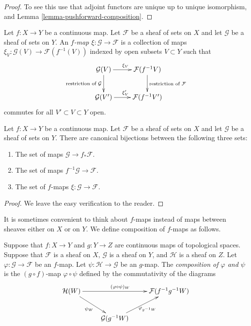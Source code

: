 \begin{proof}
To see this
use that adjoint functors are unique up to unique isomorphism,
and Lemma \ref{lemma-pushforward-composition}.
\end{proof}


\begin{definition}
\label{definition-f-map}
Let $f : X \to Y$ be a continuous map.
Let $\mathcal{F}$ be a sheaf of sets on $X$ and
let $\mathcal{G}$ be a sheaf of sets on $Y$.
An {\it $f$-map $\xi : \mathcal{G} \to \mathcal{F}$}
is a collection of maps
$\xi_V : \mathcal{G}(V) \to \mathcal{F}(f^{-1}(V))$
indexed by open subsets $V \subset Y$ such that
$$
\xymatrix{
\mathcal{G}(V) \ar[r]^{\xi_V} \ar[d]_{\text{restriction of }\mathcal{G}} &
\mathcal{F}(f^{-1}V) \ar[d]^{\text{restriction of }\mathcal{F}} \\
\mathcal{G}(V') \ar[r]^{\xi_V'} &
\mathcal{F}(f^{-1}V')
}
$$
commutes for all $V' \subset V \subset Y$ open.
\end{definition}

\begin{lemma}
\label{lemma-f-map}
Let $f : X \to Y$ be a continuous map.
Let $\mathcal{F}$ be a sheaf of sets on $X$ and
let $\mathcal{G}$ be a sheaf of sets on $Y$.
There are canonical bijections between the following three sets:
\begin{enumerate}
\item The set of maps $\mathcal{G} \to f_*\mathcal{F}$.
\item The set of maps $f^{-1}\mathcal{G} \to \mathcal{F}$.
\item The set of $f$-maps $\xi : \mathcal{G} \to \mathcal{F}$.
\end{enumerate}
\end{lemma}

\begin{proof}
We leave the easy verification to the reader.
\end{proof}

\noindent
It is sometimes convenient to think about $f$-maps
instead of maps between sheaves either on $X$ or on $Y$.
We define composition of $f$-maps as follows.

\begin{definition}
\label{definition-composition-f-maps}
Suppose that $f : X \to Y$ and $g : Y \to Z$ are continuous
maps of topological spaces. Suppose that $\mathcal{F}$ is
a sheaf on $X$, $\mathcal{G}$ is a sheaf on $Y$, and
$\mathcal{H}$ is a sheaf on $Z$.
Let $\varphi : \mathcal{G} \to \mathcal{F}$ be an $f$-map.
Let $\psi : \mathcal{H} \to \mathcal{G}$ be an $g$-map.
The {\it composition of $\varphi$ and $\psi$} is the
$(g \circ f)$-map $\varphi \circ \psi$ defined
by the commutativity of the diagrams
$$
\xymatrix{
\mathcal{H}(W) \ar[rr]^{(\varphi \circ \psi)_W}
\ar[rd]_{\psi_W} & &
\mathcal{F}(f^{-1}g^{-1}W) \\
&
\mathcal{G}(g^{-1}W)
\ar[ru]_{\varphi_{g^{-1}W}}
}
$$
\end{definition}

